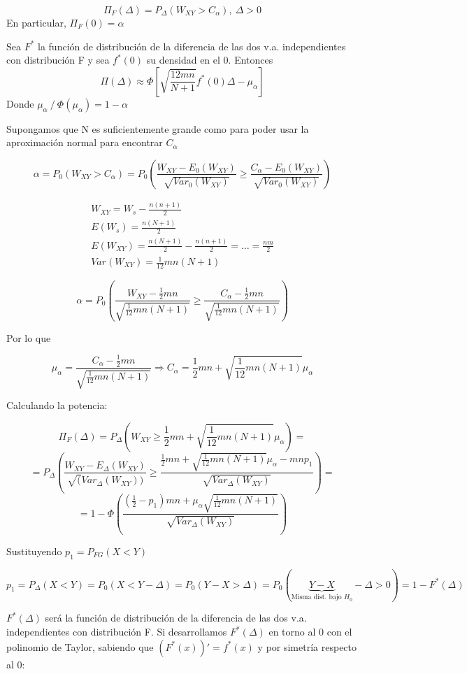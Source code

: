$$
\Pi_F(\Delta)=P_\Delta(W_{XY}>C_\alpha),\ \Delta>0
$$
En particular, $\Pi_F(0)=\alpha$

\begin{theorem}
    Sea $F^*$ la función de distribución de la diferencia de las dos v.a. independientes con distribución F y sea $f^*(0)$ su densidad en el 0. Entonces
    $$
    \Pi(\Delta)\approx\Phi\left[\sqrt{\frac{12mn}{N+1}}f^*(0)\Delta-\mu_\alpha\right]
    $$
    Donde $\mu_\alpha\ /\ \Phi(\mu_\alpha)=1-\alpha$
\end{theorem}

Supongamos que N es suficientemente grande como para poder usar la aproximación normal para encontrar $C_\alpha$

$$
\alpha = P_0(W_{XY}>C_\alpha)=P_0\left(\frac{W_{XY}-E_0(W_{XY})}{\sqrt{Var_0(W_{XY})}}\geq \frac{C_\alpha-E_0(W_{XY})}{\sqrt{Var_0(W_{XY})}}\right)
$$

$$
\begin{array}{c}
    W_{XY}=W_s-\frac{n(n+1)}{2}\\
    E(W_s)=\frac{n(N+1)}{2}\\
    E(W_{XY})=\frac{n(N+1)}{2}-\frac{n(n+1)}{2}=\dots=\frac{nm}{2}\\
    Var(W_{XY})=\frac{1}{12}mn(N+1)
\end{array}
$$

$$
\alpha=P_0\left(\frac{W_{XY}-\frac{1}{2}mn}{\sqrt{\frac{1}{12}mn(N+1)}}\geq \frac{C_\alpha-\frac{1}{2}mn}{\sqrt{\frac{1}{12}mn(N+1)}}\right)
$$

Por lo que 

$$
\mu_\alpha=\frac{C_\alpha-\frac{1}{2}mn}{\sqrt{\frac{1}{12}mn(N+1)}} \Longrightarrow C_\alpha=\frac{1}{2}mn+\sqrt{\frac{1}{12}mn(N+1)}\mu_\alpha
$$

Calculando la potencia:

$$
\Pi_F(\Delta)=P_\Delta\left(W_{XY}\geq\frac{1}{2}mn+\sqrt{\frac{1}{12}mn(N+1)}\mu_\alpha\right)=
$$
$$
=P_\Delta\left(\frac{W_{XY}-E_\Delta(W_{XY})}{\sqrt(Var_\Delta(W_{XY}))}\geq\frac{\frac{1}{2}mn+\sqrt{\frac{1}{12}mn(N+1)}\mu_\alpha-mnp_1}{\sqrt{Var_\Delta(W_{XY})}} \right)=
$$
$$
=1-\Phi\left(\frac{\left(\frac{1}{2}-p_1\right)mn+\mu_\alpha\sqrt{\frac{1}{12}mn(N+1)}}{\sqrt{Var_\Delta(W_{XY})}}\right)
$$

Sustituyendo $p_1=P_{FG}(X<Y)$

$$
p_1=P_\Delta(X<Y)=P_0(X<Y-\Delta)=P_0(Y-X>\Delta)=P_0(\underbrace{Y-X}_\text{Misma dist. bajo $H_0$}-\Delta>0)=1-F^*(\Delta)
$$

$F^*(\Delta)$ será la función de distribución de la diferencia de las dos v.a. independientes con distribución F. Si desarrollamos $F^*(\Delta)$ en torno al 0 con el polinomio de Taylor, sabiendo que $(F^*(x))'=f^*(x)$ y por simetría respecto al 0:

